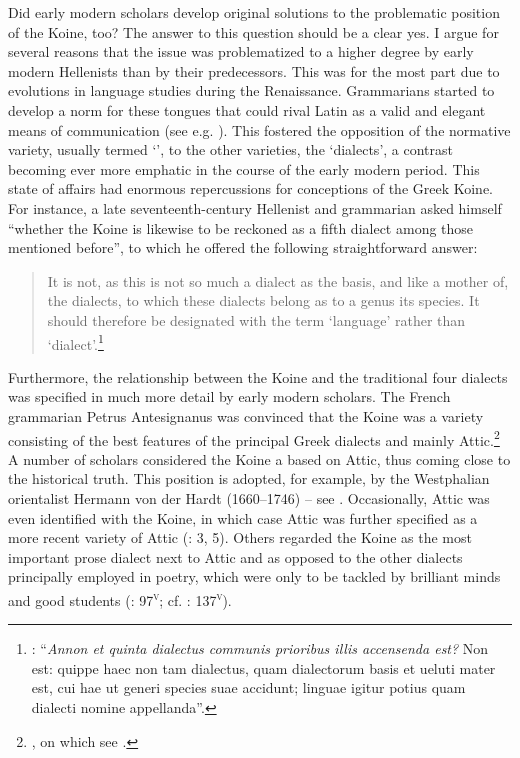 Did early modern scholars develop original solutions to the problematic position of the Koine, too? The answer to this question should be a clear yes. I argue for several reasons that the issue was problematized to a higher degree by early modern Hellenists than by their predecessors. This was for the most part due to evolutions in  language studies during the Renaissance. Grammarians started to develop a norm for these tongues that could rival Latin as a valid and elegant means of communication (see e.g. \citealt{Giard1992}). This fostered the opposition of the normative variety, usually termed ‘’, to the other varieties, the ‘dialects’, a contrast becoming ever more emphatic in the course of the early modern period. This state of affairs had enormous repercussions for conceptions of the Greek Koine. For instance, a late seventeenth-century Hellenist and grammarian asked himself “whether the Koine is likewise to be reckoned as a fifth dialect among those mentioned before”, to which he offered the following straightforward answer:

\begin{quote}
It is not, as this is not so much a dialect as the basis, and like a mother of, the dialects, to which these dialects belong as to a genus its species. It should therefore be designated with the term ‘language’ rather than ‘dialect’.\footnote{\citet[495]{Ursin1691}: “\textit{Annon et quinta dialectus communis prioribus illis accensenda est?} Non est: quippe haec non tam dialectus, quam dialectorum basis et ueluti mater est, cui hae ut generi species suae accidunt; linguae igitur potius quam dialecti nomine appellanda”.}
\end{quote}

Furthermore, the relationship between the Koine and the traditional four dialects was specified in much more detail by early modern scholars. The French grammarian Petrus Antesignanus was convinced that the Koine was a variety consisting of the best features of the principal Greek dialects and mainly Attic.\footnote{\citet[12--13]{Antesignanus1554}, on which see \citet[130--131]{VanRooy2016c}.} A number of scholars considered the Koine a  based on Attic, thus coming close to the historical truth. This position is adopted, for example, by the Westphalian orientalist Hermann von der Hardt (1660–1746) – see \citet[17--18]{Von1705}. Occasionally, Attic was even identified with the Koine, in which case Attic was further specified as a more recent variety of Attic (\citealt{Georgi1733}: 3, 5). Others regarded the Koine as the most important prose dialect next to Attic and as opposed to the other dialects principally employed in poetry, which were only to be tackled by brilliant minds and good students (\citealt{Vives1531}: 97\textsc{\textsuperscript{v}}; cf. \citealt{Vuidius1569}: 137\textsc{\textsuperscript{v}}).

